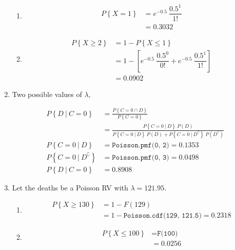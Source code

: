 \begin{enumerate}
\begin{enumerate}
			\item 
			\begin{align}
				P \left\{X = 1\right\} &= e^{-0.5} \ \dfrac{0.5^1}{1!} \nonumber \\
				&= 0.3032
			\end{align}
			
			\item 
			\begin{align}
				P \left\{X \geq 2\right\} &= 1 - P \left\{X \leq 1\right\} \nonumber \\
				&= 1 - \left[e^{-0.5} \ \dfrac{0.5^0}{0!} + e^{-0.5} \ \dfrac{0.5^1}{1!}\right] \nonumber \\
				&= 0.0902
			\end{align}
			
		\end{enumerate}
	 
	
	\item Two possible values of $ \lambda $, 
	
		\begin{align}
			P \left\{D\ |\ C = 0 \right\} &= \frac{P\left\{C = 0 \cap D\right\}}{P\left\{C = 0\right\}} \\
			&= \frac{P \left\{C = 0\ |\ D \right\}\ P(D)}{P \left\{C = 0\ |\ D \right\}\ P(D) + P \left\{C = 0\ |\ D^\complement \right\}\ P(D^\complement)} \nonumber \\
			P \left\{C = 0\ |\ D \right\} &= \texttt{Poisson.pmf(0, 2)} = 0.1353 \nonumber \\
			P \left\{C = 0\ |\ D^\complement \right\} &= \texttt{Poisson.pmf(0, 3)} = 0.0498 \nonumber \\
			P \left\{D\ |\ C = 0 \right\} &= 0.8908
		\end{align}
	 
	
	\item Let the deaths be a Poisson RV with $ \lambda = 121.95 $.
	
		\begin{enumerate}
			\item 
			\begin{align}
				P \left\{X \geq 130\right\} &= 1 - F(129) \nonumber \\
				&= 1 - \texttt{Poisson.cdf(129, 121.5)} = 0.2318
			\end{align}
			
			\item 
			\begin{align}
				P \left\{X \leq 100\right\} &= \texttt{F(100)} \nonumber \\
				&= 0.0256
			\end{align}
			

\end{enumerate}
\end{enumerate}
